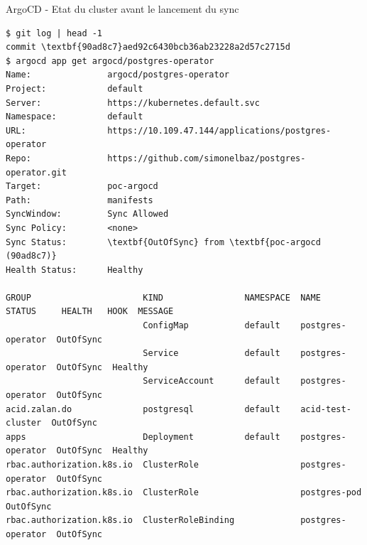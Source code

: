 \begin{frame}[fragile]{ArgoCD - Etat du cluster avant le lancement du sync}

\begin{tiny}
\begin{Verbatim}[commandchars=\\\{\}]
$ git log | head -1
commit \textbf{90ad8c7}aed92c6430bcb36ab23228a2d57c2715d
$ argocd app get argocd/postgres-operator
Name:               argocd/postgres-operator
Project:            default
Server:             https://kubernetes.default.svc
Namespace:          default
URL:                https://10.109.47.144/applications/postgres-operator
Repo:               https://github.com/simonelbaz/postgres-operator.git
Target:             poc-argocd
Path:               manifests
SyncWindow:         Sync Allowed
Sync Policy:        <none>
Sync Status:        \textbf{OutOfSync} from \textbf{poc-argocd (90ad8c7)}
Health Status:      Healthy

GROUP                      KIND                NAMESPACE  NAME               STATUS     HEALTH   HOOK  MESSAGE
                           ConfigMap           default    postgres-operator  OutOfSync                 
                           Service             default    postgres-operator  OutOfSync  Healthy        
                           ServiceAccount      default    postgres-operator  OutOfSync                 
acid.zalan.do              postgresql          default    acid-test-cluster  OutOfSync                 
apps                       Deployment          default    postgres-operator  OutOfSync  Healthy        
rbac.authorization.k8s.io  ClusterRole                    postgres-operator  OutOfSync                 
rbac.authorization.k8s.io  ClusterRole                    postgres-pod       OutOfSync                 
rbac.authorization.k8s.io  ClusterRoleBinding             postgres-operator  OutOfSync
\end{Verbatim}
\end{tiny}

\end{frame}


